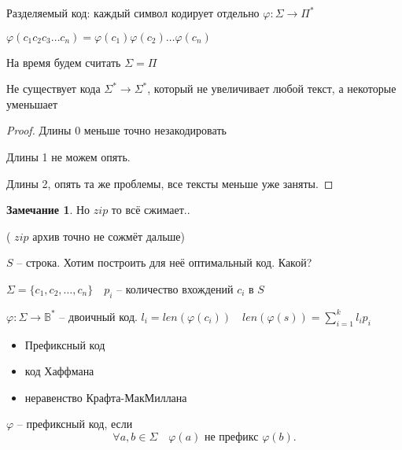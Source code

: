 \documentclass{book}
\theoremstyle{definition}
\newtheorem*{note}{Замечание}
\begin{document}
\begin{definition}
    Разделяемый код: каждый символ кодирует отдельно $\varphi:\Sigma \to  \Pi^*$

    $\varphi(c_1c_2c_3\ldots c_n) = \varphi(c_1)\varphi(c_2) \ldots \varphi(c_n)$
\end{definition}

На время будем считать $\Sigma=\Pi$

 \begin{statement}
    Не существует кода $\Sigma^*\to \Sigma^*$, который не увеличивает любой текст, а некоторые уменьшает
\end{statement}
\begin{proof}
    Длины 0 меньше точно незакодировать

    Длины 1 не можем опять.

    Длины 2, опять та же проблемы, все тексты меньше уже заняты.
\end{proof}

\begin{note}
    Но $zip$ то всё сжимает..

    ( $zip$ архив точно не сожмёт дальше)
\end{note}

$S$ -- строка. Хотим построить для неё оптимальный код. Какой?

$\Sigma = \{c_1, c_2, \ldots, c_n\}\quad p_i$ -- количество вхождений $c_i$  в  $S$

$\varphi:\Sigma \to \mathbb{B}^*$ -- двоичный код. $l_i = len(\varphi(c_i))\quad len(\varphi(s)) = \sum\limits_{i=1}^{k} l_ip_i$

\begin{itemize}
    \item Префиксный код
    \item код Хаффмана
    \item неравенство Крафта-МакМиллана
\end{itemize}

\begin{definition}
    $\varphi$ -- префиксный код, если  \[
        \forall a, b\in \Sigma\quad \varphi(a) \text{ не префикс } \varphi(b)
    .\] 
\end{definition}
\end{document}
